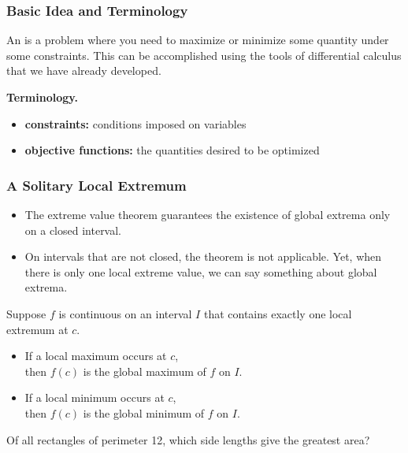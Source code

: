 \documentclass[10pt,t,handout,ignorenonframetext,aspectratio=169]{beamer}
\title[\course]{\lecTitle}
\institute[Ohio State]
{
  \medskip
}
\date[\week]{\semester}
\author{Tae Eun Kim, Ph.D.}
\begin{document}
\begin{frame}
  \titlepage
\end{frame}

\begin{frame}
  \frametitle{Basic Idea and Terminology}
  An  is a problem where you need to maximize
  or minimize some quantity under some constraints. This can be
  accomplished using the tools of differential calculus that we have
  already developed.

  \vs

  \textbf{Terminology.}
  \begin{itemize}
  \item \textbf{constraints:} conditions imposed on variables
  \item \textbf{objective functions:} the quantities desired to be optimized
  \end{itemize}
\end{frame}

\begin{frame}
  \frametitle{A Solitary Local Extremum}
  \begin{itemize}
  \item The extreme value theorem guarantees the existence of global
    extrema only on a closed interval.
  \item On intervals that are not closed, the theorem is not
    applicable. Yet, when there is only one local extreme value, we
    can say something about global extrema.
  \end{itemize}

  \begin{thm}
    Suppose $f$ is continuous on an interval $I$ that contains exactly
    one local extremum at $c$.
    \begin{itemize}
    \item If a local maximum occurs at $c$, \\
      then $f(c)$ is the global maximum of $f$ on $I$.
    \item If a local minimum occurs at $c$, \\
      then $f(c)$ is the global minimum of $f$ on $I$.
    \end{itemize}
  \end{thm}
\end{frame}

\begin{frame}
  \vs
  \begin{example}
    Of all rectangles of perimeter 12, which side lengths give the
    greatest area?
  \end{example}
\end{frame}
\end{document}
